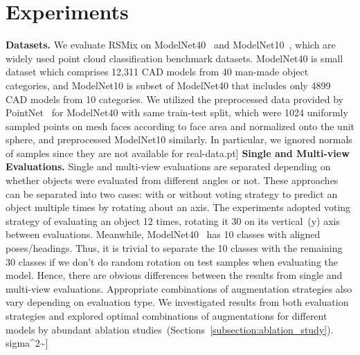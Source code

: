 \documentclass[final]{cvpr}
\begin{document}
\section{Experiments}
\vspace{-0.1cm}
\noindent \textbf{Datasets.} We evaluate RSMix on ModelNet40~\cite{wu20153d} and ModelNet10~\cite{wu20153d}, which are widely used point cloud classification benchmark datasets. ModelNet40 is small dataset which comprises 12,311 CAD models from 40 man-made object categories, and ModelNet10 is subset of ModelNet40 that includes only 4899 CAD models from 10 categories. We utilized the preprocessed data provided by PointNet~\cite{qi2017pointnet} for ModelNet40 with same train-test split, which were 1024 uniformly sampled points on mesh faces according to face area and normalized onto the unit sphere, and preprocessed ModelNet10 similarly. In particular, we ignored normals of samples since they are not available for real-data.\2pt]
\noindent \textbf{Single and Multi-view Evaluations.} Single and multi-view evaluations are separated depending on whether objects were evaluated from different angles or not. These approaches can be separated into two cases: with or without voting strategy to predict an object multiple times by rotating about an axis. The experiments adopted voting strategy of evaluating an object 12 times, rotating it 30 on its vertical~(y) axis between evaluations. Meanwhile, ModelNet40~\cite{wu20153d} has 10 classes with aligned poses/headings. Thus, it is trivial to separate the 10 classes with the remaining 30 classes if we don't do random rotation on test samples when evaluating the model. Hence, there are obvious differences between the results from single and multi-view evaluations. Appropriate combinations of augmentation strategies also vary depending on evaluation type. We investigated results from both evaluation strategies and explored optimal combinations of augmentations for different models by abundant ablation studies~(Sections~\ref{subsection:ablation_study}).\\sigma^{2}\sim\uparrow\uparrow\uparrow\uparrow\uparrow\uparrow\uparrow\uparrow{}]
\end{document}
